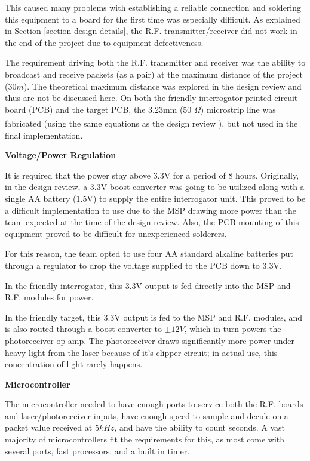 \documentclass[letterpaper,10pt]{article}
\begin{document}
\begin{spacing}{1.15}
This caused many problems with establishing a reliable connection and soldering this equipment to a board for the first time was especially difficult. As explained in Section \ref{section-design-details}, the R.F. transmitter/receiver did not work in the end of the project due to equipment defectiveness.

The requirement driving both the R.F. transmitter and receiver was the ability to broadcast and receive packets (as a pair) at the maximum distance of the project ($30m$). The theoretical maximum distance was explored in the design review and thus are not be discussed here. On both the friendly interrogator printed circuit board (PCB) and the target PCB, the 3.23mm (50 $\Omega$) microstrip line was fabricated (using the same equations as the design review \textsuperscript{\cite{Microstrip}}), but not used in the final implementation.


\hspace{5mm}\textbf{Voltage/Power Regulation} \label{section:interrogator-voltage-regulation-design-procedure}

It is required that the power stay above 3.3V for a period of 8 hours. Originally, in the design review, a 3.3V boost-converter was going to be utilized along with a single AA battery (1.5V) to supply the entire interrogator unit. This proved to be a difficult implementation to use due to the MSP drawing more power than the team expected at the time of the design review. Also, the PCB mounting of this equipment proved to be difficult for unexperienced solderers. 

For this reason, the team opted to use four AA standard alkaline batteries put through a regulator to drop the voltage supplied to the PCB down to 3.3V. 

In the friendly interrogator, this 3.3V output is fed directly into the MSP and R.F. modules for power.

In the friendly target, this 3.3V output is fed to the MSP and R.F. modules, and is also routed through a boost converter to $\pm 12V$, which in turn powers the photoreceiver op-amp. The photoreceiver draws significantly more power under heavy light from the laser because of it's clipper circuit; in actual use, this concentration of light rarely happens. 

 
\hspace{5mm}\textbf{Microcontroller} \label{section:system-design-procedure}

The microcontroller needed to have enough ports to service both the R.F. boards and laser/photoreceiver inputs, have enough speed to sample and decide on a packet value received at $5kHz$, and have the ability to count seconds. A vast majority of microcontrollers fit the requirements for this, as most come with several ports, fast processors, and a built in timer.


\end{spacing}
\end{document}
